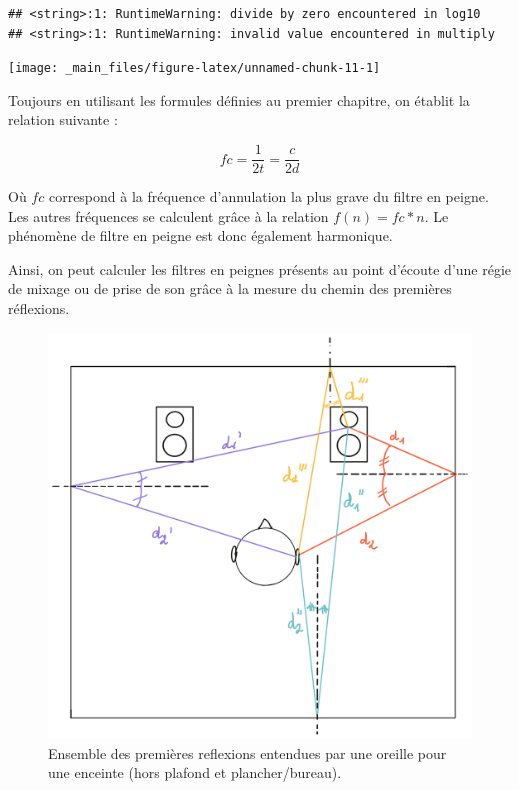 \documentclass[
]{book}
\begin{document}
\begin{verbatim}
## <string>:1: RuntimeWarning: divide by zero encountered in log10
## <string>:1: RuntimeWarning: invalid value encountered in multiply
\end{verbatim}

\begin{center}\texttt{[image: \_main\_files/figure-latex/unnamed-chunk-11-1]} \end{center}

Toujours en utilisant les formules définies au premier chapitre, on établit la relation suivante :

\[ fc = \frac 1{2t} = \frac c{2d} \]

Où \(fc\) correspond à la fréquence d'annulation la plus grave du filtre en peigne. Les autres fréquences se calculent grâce à la relation \(f(n) = fc*n\). Le phénomène de filtre en peigne est donc également harmonique.

Ainsi, on peut calculer les filtres en peignes présents au point d'écoute d'une régie de mixage ou de prise de son grâce à la mesure du chemin des premières réflexions.

\begin{figure}

{\centering \includegraphics{_resources/drawings/roomPr} 

}

\caption{Ensemble des premières reflexions entendues par une oreille pour une enceinte (hors plafond et plancher/bureau).}\label{fig:unnamed-chunk-12}
\end{figure}
\end{document}
